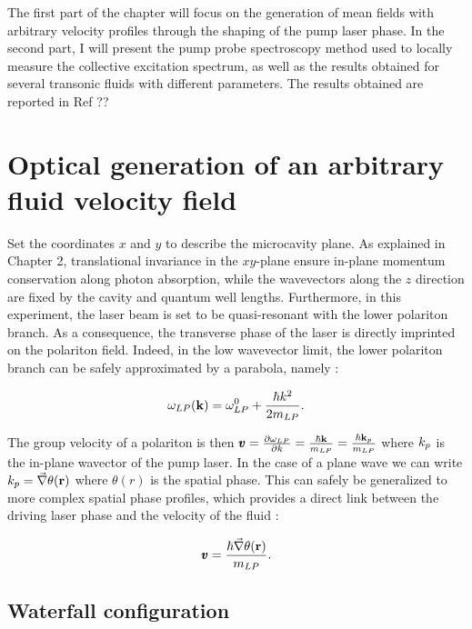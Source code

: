 The first part of the chapter will focus on the generation of mean fields with arbitrary velocity profiles through the shaping of the pump laser phase. In the second part, I will present the pump probe spectroscopy method used to locally measure the collective excitation spectrum, as well
as the results obtained for several transonic fluids with different parameters. The results obtained are reported in Ref ??

\section{Optical generation of an arbitrary fluid velocity field}


Set the coordinates $x$ and $y$ to describe the microcavity plane. As explained in Chapter 2, translational invariance in the $xy$-plane ensure in-plane momentum conservation along photon absorption, while the wavevectors along the
$z$ direction are fixed by the cavity and quantum well lengths. Furthermore, in this experiment, the laser beam is set to be quasi-resonant with the lower polariton branch. As a consequence, the transverse phase of the laser is directly imprinted on the polariton field.
Indeed, in the low wavevector limit, the lower polariton branch can be safely approximated by a parabola, namely :

\begin{equation}
    \omega_{LP}(\mathbf{k}) = \omega_{LP}^0 + \dfrac{\hbar k^2}{2m_{LP}}.
\end{equation}

The group velocity of a polariton is then $\pmb{v} = \frac{\partial \omega_{LP}}{\partial k} = \frac{\hbar \mathbf{k}}{m_{LP}}= \frac{\hbar \mathbf{k}_p}{m_{LP}}$ where $k_p$ is the in-plane wavector of the pump laser.
In the case of a plane wave  we can write $k_p=\vec{\nabla}\theta(\mathbf{r})$ where $\theta(r)$ is the spatial phase. This can safely be generalized to more complex spatial phase profiles,
which provides a direct link between the driving laser phase and the velocity of the fluid :

\begin{equation}
    \pmb{v} = \dfrac{\hbar \vec{\nabla} \theta(\mathbf{r})}{m_{LP}} .
\end{equation}

\subsection{Waterfall configuration}

